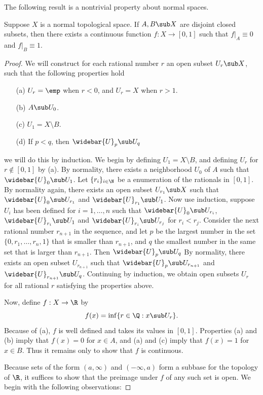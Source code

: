The following result is a nontrivial property about normal spaces.
\begin{theorem}\label{Urysohn lemma}
Suppose $X$ is a normal topological space. If $A,B\sub X$ are disjoint closed subsets, then there exists a continuous function $f:X\to[0,1]$ such that $f|_A\equiv0$ and $f|_B\equiv1$.
\end{theorem}
\begin{proof}We will construct for each rational number $r$ an open subset $U_r\sub X$, such
that the following properties hold
\begin{itemize}
\item[(a)] $U_r=\emp$ when $r<0$, and $U_r=X$ when $r>1$.
\item[(b)] $A\sub U_0$.
\item[(c)] $U_1=X\setminus B$.
\item[(d)] If $p<q$, then $\widebar{U}_p\sub U_q$
\end{itemize}
we will do this by induction. We begin by defining $U_1=X\setminus B$, and defining $U_r$ for $r\notin [0,1]$ by (a). By normality, there exists a neighborhood $U_0$ of $A$ such that $\widebar{U}_0\sub U_1$. Let $\{r_i\}_{i\in\N}$ be a enumeration of the rationals in $[0,1]$. By normality again, there exists an open subset $U_{r_1}\sub X$ such that $\widebar{U}_0\sub U_{r_1}$ and $\widebar{U}_{r_1}\sub U_1$. Now use induction, suppose $U_i$ has been defined for $i=1,\dots,n$ such that $\widebar{U}_0\sub U_{r_i}$, $\widebar{U}_{r_{i}}\sub U_1$ and $\widebar{U}_{r_{i}}\sub U_{r_{j}}$ for $r_i<r_j$. Consider the next rational number $r_{n+1}$ in the sequence, and let $p$ be the largest number in the set $\{0,r_1,\dots,r_n,1\}$ that is smaller than $r_{n+1}$, and $q$ the smallest number in the same set that is larger than $r_{n+1}$. Then $\widebar{U}_p\sub U_q$ By normality, there exists an open subset $U_{r_{n+1}}$ such that $\widebar{U}_{p}\sub U_{r_{n+1}}$ and $\widebar{U}_{r_{n+1}}\sub U_q$. Continuing by induction, we obtain open subsets $U_r$ for all rational $r$ satisfying the properties above.\par
Now, define $f:X\to\R$ by
\[f(x)=\inf\{r\in\Q:x\sub U_r\}.\]
Because of (a), $f$ is well defined and takes its values in $[0,1]$. Properties (a) and (b)
imply that $f(x)=0$ for $x\in A$, and (a) and (c) imply that $f(x)=1$ for $x\in B$. Thus
it remains only to show that $f$ is continuous.\par
Because sets of the form $(a,\infty)$ and $(-\infty,a)$ form a subbase for the topology of $\R$, it suffices to show that the preimage under $f$ of any such set is open. We begin with the following observations:

\end{proof}
